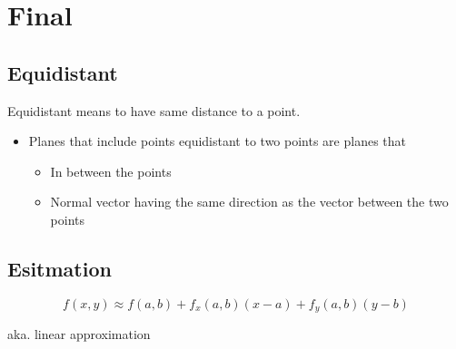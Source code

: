 \section{Final}

  \subsection{Equidistant}

    Equidistant means to have same distance to a point.

    \begin{itemize}
      \item Planes that include points equidistant to two points are planes
      that
      \begin{itemize}
        \item In between the points
        \item Normal vector having the same direction as the vector between the
        two points
      \end{itemize}
    \end{itemize}

  \subsection{Esitmation}

    \begin{equation}
      f\left( x, y \right)
      \approx f\left( a, b \right)
      + f_{x} \left( a, b \right) \left( x - a \right)
      + f_{y} \left( a, b \right) \left( y - b \right)
    \end{equation}

    aka. linear approximation